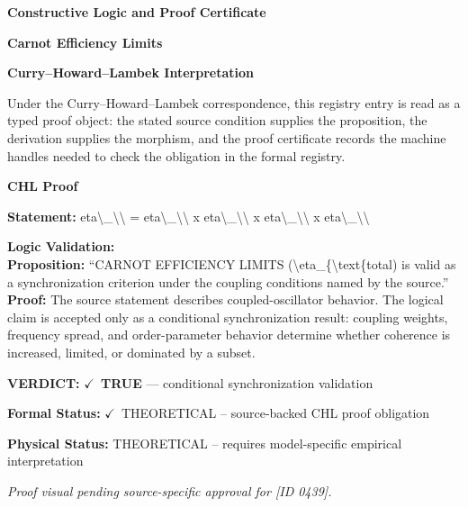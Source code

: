 \clearpage
\begingroup\tzpsupportsetup
\noindent\textbf{\fontsize{10.8pt}{12.8pt}\selectfont [ID 0439] Constructive Logic and Proof Certificate}\par
\noindent\textbf{\fontsize{10pt}{12pt}\selectfont Carnot Efficiency Limits}\par
\vspace{0.45em}
\begingroup
\footnotesize
\setlength{\parskip}{0.22em}
\setlength{\parindent}{0pt}
\noindent\textbf{Curry--Howard--Lambek Interpretation}\par
Under the Curry--Howard--Lambek correspondence, this registry entry is read as a typed proof
object: the stated source condition supplies the proposition, the derivation supplies the
morphism, and the proof certificate records the machine handles needed to check the obligation
in the formal registry.

\vspace{0.45em}
\noindent\textbf{CHL Proof}\par
\textbf{Statement:} eta\textbackslash{}\_\textbackslash{}\textbackslash{} = eta\textbackslash{}\_\textbackslash{}\textbackslash{} x eta\textbackslash{}\_\textbackslash{}\textbackslash{} x eta\textbackslash{}\_\textbackslash{}\textbackslash{} x eta\textbackslash{}\_\textbackslash{}\textbackslash{}

\textbf{Logic Validation:}\\
\textbf{Proposition:} ``CARNOT EFFICIENCY LIMITS (\textbackslash{}eta\_\{\textbackslash{}text\{total) is valid as a synchronization criterion
under the coupling conditions named by the source.''\\
\textbf{Proof:} The source statement describes coupled-oscillator behavior. The logical claim is
accepted only as a conditional synchronization result: coupling weights, frequency
spread, and order-parameter behavior determine whether coherence is increased, limited,
or dominated by a subset.

\textbf{VERDICT:} \ensuremath{\checkmark}\ \textbf{TRUE} --- conditional synchronization validation

\textbf{Formal Status:} \ensuremath{\checkmark}\ THEORETICAL -- source-backed CHL proof obligation

\textbf{Physical Status:} THEORETICAL -- requires model-specific empirical interpretation
\par\vspace{0.45em}
\par
\vfill
\begingroup\footnotesize\itshape
Proof visual pending source-specific approval for [ID 0439].
\par\endgroup
\vfill
\endgroup
\endgroup
